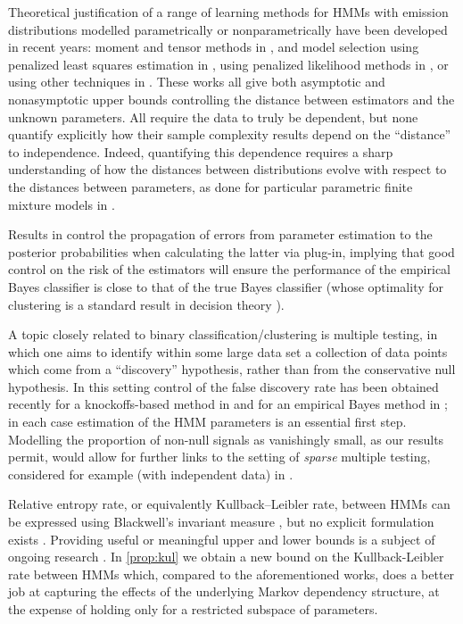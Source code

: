 \documentclass[journal]{IEEEtran}
\newcommand{\1}{\boldsymbol{1}}
\begin{document}
	Theoretical justification of a range of learning methods for HMMs with emission distributions modelled parametrically or nonparametrically have been developed in recent years: moment and tensor methods in \cite{AGHKT14, dCGlC17}, and model selection using penalized least squares estimation in \cite{MR3543517, MR3892326}, using penalized likelihood methods in \cite{Luc:2018}, or using other techniques in \cite{MR3862446}.
	These works all give both asymptotic and nonasymptotic upper bounds controlling the distance between estimators and the unknown parameters. All require the data to truly be dependent, but none quantify explicitly how their sample complexity results depend on the ``distance'' to independence.
	Indeed, quantifying this dependence requires a sharp understanding of how the distances between distributions evolve with respect to the distances between parameters, as done for particular parametric finite mixture models in \cite{MR3130325, MR3851757, Wu:2020}.

	Results in \cite{dCGlC17} control the
	propagation of errors from parameter estimation to the posterior probabilities
	when calculating the latter via plug-in, implying that good control on the risk
	of the estimators will ensure the performance of the empirical Bayes classifier
	is close to that of the true Bayes classifier (whose optimality for clustering is a standard
	result in decision theory \cite{devroye2013probabilistic}).

	A topic closely related to binary classification/clustering is multiple testing, in which one aims to identify within some large data set a collection of data points which come from a ``discovery'' hypothesis, rather than from the conservative null hypothesis. 	In this setting control of the false discovery rate has been obtained recently for a knockoffs-based method  in \cite{MR3912377} and for an empirical Bayes method in \cite{SunCai09,EIK:2021}; in each case estimation of the HMM parameters is an essential first step. Modelling the proportion of non-null signals as vanishingly small, as our results permit, would allow for further links to the setting of \emph{sparse} multiple testing, considered for example (with independent data) in \cite{MR2281879,MR4152112}.

	Relative entropy rate, or equivalently Kullback--Leibler rate, between  HMMs can be expressed using Blackwell's invariant measure \cite{B57}, but no explicit formulation exists 	\cite{SiNa2008}. Providing useful or meaningful upper and lower bounds is a subject of ongoing research
	\cite{Do03, LuoGuo09, FuhMei2015}. In \cref{prop:kul} we obtain a new bound on the Kullback-Leibler rate between HMMs which, compared to the aforementioned works, does a better job at capturing the effects of the underlying Markov dependency structure, at the expense of holding only for a restricted subspace of parameters.
\end{document}
